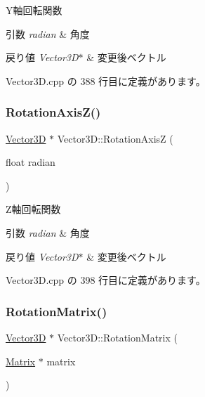 Y軸回転関数 


\begin{DoxyParams}{引数}
{\em radian} & 角度 \\
\hline
\end{DoxyParams}

\begin{DoxyRetVals}{戻り値}
{\em Vector3\+D$\ast$} & 変更後ベクトル \\
\hline
\end{DoxyRetVals}


 Vector3\+D.\+cpp の 388 行目に定義があります。

\mbox{\label{class_vector3_d_a34daa7e7dfbf578c45997f2cb06a86ec}} 
\subsubsection{\texorpdfstring{Rotation\+Axis\+Z()}{RotationAxisZ()}}
{\footnotesize\ttfamily \mbox{\hyperlink{class_vector3_d}{Vector3D}} $\ast$ Vector3\+D\+::\+Rotation\+AxisZ (\begin{DoxyParamCaption}\item[{float}]{radian }\end{DoxyParamCaption})}



Z軸回転関数 


\begin{DoxyParams}{引数}
{\em radian} & 角度 \\
\hline
\end{DoxyParams}

\begin{DoxyRetVals}{戻り値}
{\em Vector3\+D$\ast$} & 変更後ベクトル \\
\hline
\end{DoxyRetVals}


 Vector3\+D.\+cpp の 398 行目に定義があります。

\mbox{\label{class_vector3_d_a8c48b70ba67f7ad84fb04d3b84836e77}} 
\subsubsection{\texorpdfstring{Rotation\+Matrix()}{RotationMatrix()}}
{\footnotesize\ttfamily \mbox{\hyperlink{class_vector3_d}{Vector3D}} $\ast$ Vector3\+D\+::\+Rotation\+Matrix (\begin{DoxyParamCaption}\item[{\mbox{\hyperlink{class_matrix}{Matrix}} $\ast$}]{matrix }\end{DoxyParamCaption})}



